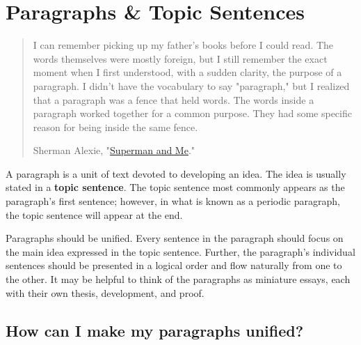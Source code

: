 \hypertarget{organization}{}
\chapter{Paragraphs \& Topic Sentences}

\begin{quote}
\small
I can remember picking up my father's books before I could read. The words themselves were mostly foreign, but I still remember the exact moment when I first understood, with a sudden clarity, the purpose of a paragraph. I didn't have the vocabulary to say "paragraph," but I realized that a paragraph was a fence that held words. The words inside a paragraph worked together for a common purpose. They had some specific reason for being inside the same fence.

\textemdash Sherman Alexie, "\href{http://articles.latimes.com/1998/apr/19/books/bk-42979}{Superman and Me}."

\end{quote}

A paragraph is a unit of text devoted to developing an idea. The idea is usually stated 
in a \textbf{topic sentence}. The topic sentence most commonly appears as the paragraph's first sentence;
however, in what is known as a periodic paragraph, the topic sentence will appear at the end.

Paragraphs should be unified. Every sentence in the paragraph should focus on the main idea expressed in the topic sentence. Further, the paragraph's individual sentences should be presented in a logical order and flow naturally from one to the other. It may be helpful to think of the paragraphs as miniature essays, each with their own thesis, development, and proof. 

\section{How can I make my paragraphs unified?}

